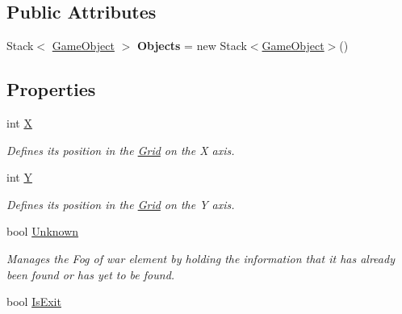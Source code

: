 \subsection*{Public Attributes}
\begin{DoxyCompactItemize}
\item 
\mbox{\label{class_roguelike_r_p_g_1_1_tile_acaff404969d6ec22a857844a3da768e6}} 
Stack$<$ \mbox{\hyperlink{class_roguelike_r_p_g_1_1_game_object}{Game\+Object}} $>$ {\bfseries Objects} = new Stack$<$\mbox{\hyperlink{class_roguelike_r_p_g_1_1_game_object}{Game\+Object}}$>$()
\end{DoxyCompactItemize}
\subsection*{Properties}
\begin{DoxyCompactItemize}
\item 
int \mbox{\hyperlink{class_roguelike_r_p_g_1_1_tile_aa70af4c518d3e04eb0488460ebbbb091}{X}}
\begin{DoxyCompactList}\small\item\em Defines its position in the \mbox{\hyperlink{class_roguelike_r_p_g_1_1_grid}{Grid}} on the X axis. \end{DoxyCompactList}\item 
int \mbox{\hyperlink{class_roguelike_r_p_g_1_1_tile_abc0553a51f38c39df5d62a6595b9552f}{Y}}
\begin{DoxyCompactList}\small\item\em Defines its position in the \mbox{\hyperlink{class_roguelike_r_p_g_1_1_grid}{Grid}} on the Y axis. \end{DoxyCompactList}\item 
bool \mbox{\hyperlink{class_roguelike_r_p_g_1_1_tile_a1cee19c16fed5cfdd655487f5e79e5c8}{Unknown}}
\begin{DoxyCompactList}\small\item\em Manages the Fog of war element by holding the information that it has already been found or has yet to be found. \end{DoxyCompactList}\item 
bool \mbox{\hyperlink{class_roguelike_r_p_g_1_1_tile_a67c61a973f25af77d07a12e50b3825f2}{Is\+Exit}}
\end{DoxyCompactItemize}


